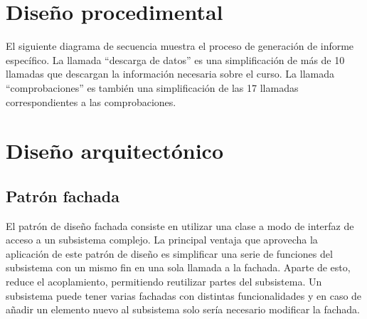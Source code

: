 \section{Diseño procedimental}
El siguiente diagrama de secuencia muestra el proceso de generación de informe específico. La llamada ``descarga de datos'' es una simplificación de más de 10 llamadas que descargan la información necesaria sobre el curso. La llamada ``comprobaciones'' es también una simplificación de las 17 llamadas correspondientes a las comprobaciones.
\section{Diseño arquitectónico}
\subsection{Patrón fachada}
El patrón de diseño fachada consiste en utilizar una clase a modo de interfaz de acceso a un subsistema complejo. La principal ventaja que aprovecha la aplicación de este patrón de diseño es simplificar una serie de funciones del subsistema con un mismo fin en una sola llamada a la fachada. Aparte de esto, reduce el acoplamiento, permitiendo reutilizar partes del subsistema. Un subsistema puede tener varias fachadas con distintas funcionalidades y en caso de añadir un elemento nuevo al subsistema solo sería necesario modificar la fachada.
